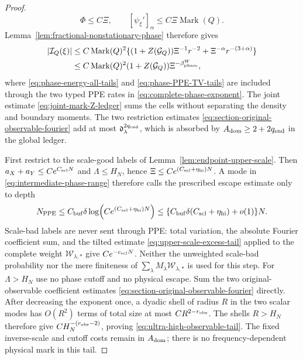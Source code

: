 \documentclass[11pt]{article}
\begin{document}
\begin{proof}
\[ \Phi\le C\Xi,\qquad
 [\psi_\xi']_\alpha\le C\Xi\operatorname{Mark}(Q).
\]
Lemma~\ref{lem:fractional-nonstationary-phase} therefore gives
\begin{align*}
 |\mathcal I_Q(\xi)|
 &\le C\operatorname{Mark}(Q)^2
 \{(1+Z(\mathcal G_Q))\Xi^{-1}r^{-2}
        +\Xi^{-\alpha}r^{-(3+\alpha)}\}\\
 &\le C\operatorname{Mark}(Q)^2(1+Z(\mathcal G_Q))
       \Xi^{-\beta_{\rm phase}^{W}},
\end{align*}
where \eqref{eq:phase-energy-all-tails} and
\eqref{eq:phase-PPE-TV-tails} are included through the two typed PPE rates
in \eqref{eq:complete-phase-exponent}.
The joint estimate \eqref{eq:joint-mark-Z-ledger} sums the cells without
separating the density and boundary moments.  The two restriction estimates
\eqref{eq:section-original-observable-fourier} add at most
$\mathfrak d_\lambda^{2q_{\rm end}}$, which is absorbed by
$A_{\rm dom}\ge2+2q_{\rm end}$ in the global ledger.

First restrict to the scale-good labels of
Lemma~\ref{lem:endpoint-upper-scale}.  Then
$a_X+a_Y\le Ce^{C_{\rm scl}N}$ and $\Lambda\le H_N$, hence
$\Xi\le Ce^{(C_{\rm scl}+\eta_{\rm hi})N}$.  A mode in
\eqref{eq:intermediate-phase-range} therefore calls the prescribed escape
estimate only to depth
\begin{equation}
\label{eq:intermediate-max-resolving-depth}
 N_{\rm PPE}\le C_{\rm buf}\delta
       \log\!\left(Ce^{(C_{\rm scl}+\eta_{\rm hi})N}\right)
 \le \{C_{\rm buf}\delta(C_{\rm scl}+\eta_{\rm hi})+o(1)\}N.
\end{equation}
Scale-bad labels are never sent through PPE: total variation, the absolute
Fourier coefficient sum, and the tilted estimate
\eqref{eq:upper-scale-excess-tail} applied to the complete weight
$\mathscr W_{\lambda,*}$ give $Ce^{-c_{\rm scl}N}$.  Neither the unweighted
scale-bad probability nor the mere finiteness of
$\sum_\lambda M_\lambda\mathscr W_{\lambda,*}$ is used for this step.
For $\Lambda>H_N$ use no phase cutoff and no physical escape.  Sum the two
original-observable coefficient estimates
\eqref{eq:section-original-observable-fourier} directly.  After decreasing
the exponent once, a dyadic shell of radius $R$ in the two scalar modes has
$O(R^2)$ terms of total size at most $CR^{2-r_{\rm obs}}$.  The shells
$R>H_N$ therefore give $CH_N^{-(r_{\rm obs}-2)}$, proving
\eqref{eq:ultra-high-observable-tail}.  The fixed inverse-scale and cutoff
costs remain in $A_{\rm dom}$; there is no frequency-dependent physical mark
in this tail.


\end{proof}
\end{document}
